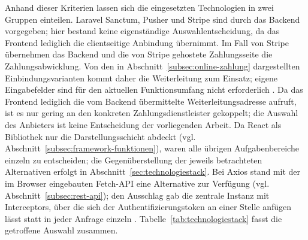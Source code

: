 Anhand dieser Kriterien lassen sich die eingesetzten Technologien
in zwei Gruppen einteilen. Laravel Sanctum, Pusher und Stripe sind
durch das Backend vorgegeben; hier bestand keine eigenständige
Auswahlentscheidung, da das Frontend lediglich die clientseitige
Anbindung übernimmt. Im Fall von Stripe übernehmen das Backend und die von Stripe gehostete
Zahlungsseite die Zahlungsabwicklung. Von den in
Abschnitt~\ref{subsec:online-zahlung} dargestellten
Einbindungsvarianten kommt daher die Weiterleitung zum Einsatz; eigene
Eingabefelder sind für den aktuellen Funktionsumfang nicht
erforderlich \cite{stripe_security_guide}. Da das Frontend lediglich
die vom Backend übermittelte Weiterleitungsadresse aufruft, ist es nur
gering an den konkreten Zahlungsdienstleister gekoppelt; die Auswahl
des Anbieters ist keine Entscheidung der vorliegenden Arbeit.
Da React als Bibliothek nur die Darstellungsschicht abdeckt (vgl.
Abschnitt~\ref{subsec:framework-funktionen}), waren alle übrigen
Aufgabenbereiche einzeln zu entscheiden; die Gegenüberstellung der
jeweils betrachteten Alternativen erfolgt in
Abschnitt~\ref{sec:technologiestack}. Bei Axios stand mit der im Browser eingebauten Fetch-\acs{API} eine
Alternative zur Verfügung (vgl. Abschnitt~\ref{subsec:rest-api});
den Ausschlag gab die zentrale Instanz mit Interceptors, über die
sich der Authentifizierungstoken an einer Stelle anfügen lässt statt
in jeder Anfrage einzeln \cite{axios_docs}. Tabelle~\ref{tab:technologiestack} fasst die
getroffene Auswahl zusammen.

